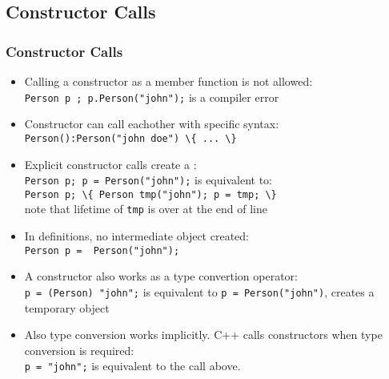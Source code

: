 \subsection{Constructor Calls}
\begin{frame}
\frametitle{Constructor Calls}
\begin{itemize}
\item Calling a constructor as a member function is not allowed:\\
\lstinline!Person p ; p.Person("john");! is a compiler error
\item Constructor  can call eachother with specific syntax:\\
\lstinline!Person():Person("john doe") \{ ... \}!
\item Explicit constructor calls create a :\\
\lstinline!Person p; p = Person("john");! is equivalent to:\\
\lstinline!Person p; \{ Person tmp("john"); p = tmp; \} !\\
note that lifetime of \lstinline!tmp! is over at the end of line
\item In definitions, no intermediate object created:\\
\lstinline!Person p =  Person("john");! 
\item A constructor also works as a type convertion operator:\\
\lstinline!p = (Person) "john";! is equivalent to \lstinline!p = Person("john")!, creates a
temporary object
\item Also type conversion works implicitly. C++ calls constructors when type conversion is required:\\
\lstinline!p = "john";! is equivalent to the call above.
\end{itemize}
\end{frame}

